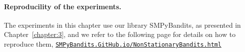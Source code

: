 
\paragraph{Reproducility of the experiments.}
%
The experiments in this chapter use our library SMPyBandits, as presented in Chapter~\ref{chapter:3},
and we refer to the following page for details on how to reproduce them,
\href{https://SMPyBandits.GitHub.io/NonStationaryBandits.html}{\texttt{SMPyBandits.GitHub.io/NonStationaryBandits.html}}
